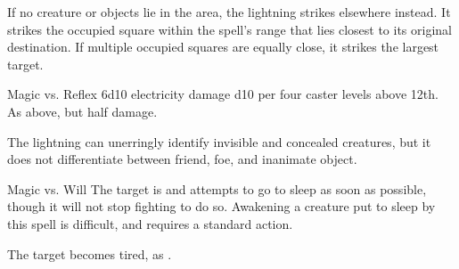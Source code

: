 \begin{spellheader}
    \spellrng{\rngext}
    \spellspecial If no creature or objects lie in the area, the lightning strikes elsewhere instead. It strikes the  occupied square within the spell's range that lies closest to its original destination. If multiple occupied squares are equally close, it strikes the largest target.
\end{spellheader}
\begin{spelleffects}
    \begin{spellattack}{Magic vs. Reflex}
        \spellsuccess 6d10 electricity damage \add d10 per four caster levels above 12th.
        \spellfailure As above, but half damage.
    \end{spellattack}
\end{spelleffects}
\begin{spellfooter}
    \spellnotes The lightning can unerringly identify invisible and concealed creatures, but it does not differentiate between friend, foe, and inanimate object.
\end{spellfooter}

\begin{spellheader}
    \spellrng{\rngmed}
    \spelldur{\durshort}
\end{spellheader}
\begin{spelleffects}
    \begin{spellattack}{Magic vs. Will}
        \spellsuccess The target is \fatigued and attempts to go to sleep as soon as possible, though it will not stop fighting to do so. Awakening a creature put to sleep by this spell is difficult, and requires a standard action.
    \end{spellattack}
\end{spelleffects}
\begin{spellfooter}

\end{spellfooter}

\begin{spellheader}
    \spelldur{\durshort}
\end{spellheader}
\begin{spelleffects}
    \spellsuccess The target becomes tired, as .
\end{spelleffects}
\begin{spellfooter}

\end{spellfooter}

